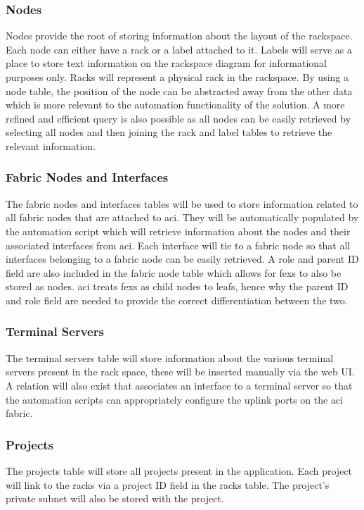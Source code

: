 \subsubsection{Nodes}
\label{design:web-application:database:nodes}
Nodes provide the root of storing
information about the layout of the rackspace. Each node can either have a rack
or a label attached to it. Labels will serve as a place to store text
information on the rackspace diagram for informational purposes only. Racks
will represent a physical rack in the rackspace. By using a node table, the
position of the node can be abstracted away from the other data which is more
relevant to the automation functionality of the solution. A more refined and efficient query is also
possible as all nodes can be easily retrieved by selecting all nodes and then
joining the rack and label tables to retrieve the relevant information.

\subsubsection{Fabric Nodes and Interfaces}
\label{design:web-application:database:fabric-nodes-and-interfaces}
The fabric
nodes and interfaces tables will be used to store information related to all
fabric nodes that are attached to \gls{aci}. They will be automatically
populated by the automation script which will retrieve information about the
nodes and their associated interfaces from \gls{aci}. Each interface will tie
to a fabric node so that all interfaces belonging to a fabric node can be
easily retrieved. A role and parent ID field are also included in the fabric
node table which allows for \gls{fex}s to also be stored as nodes. \gls{aci}
treats \gls{fex}s as child nodes to leafs, hence why the parent ID and role
field are needed to provide the correct differentiation between the two.

\subsubsection{Terminal Servers}
\label{design:web-application:database:terminal-servers}
The terminal servers
table will store information about the various terminal servers present in the
rack space, these will be inserted manually via the web UI. A relation will
also exist that associates an interface to a terminal server so that the
automation scripts can appropriately configure the uplink ports on the
\gls{aci} fabric.

\subsubsection{Projects}
\label{design:web-application:database:projects}
The projects table will store
all projects present in the application. Each project will link to the racks
via a project ID field in the racks table. The project's private subnet will
also be stored with the project.

